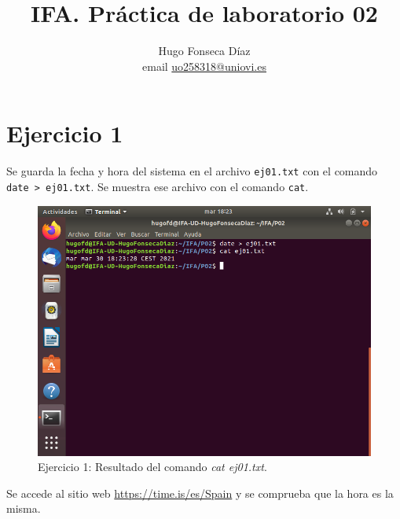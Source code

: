 \documentclass[11pt]{article}
\begin{document}
\title{IFA. Práctica de laboratorio 02}

\author{Hugo Fonseca Díaz \\ email \href{mailto:uo258318@uniovi.es}{uo258318@uniovi.es}}

\maketitle

\section{Ejercicio 1}
Se guarda la fecha y hora del sistema en el archivo \verb|ej01.txt| con el comando \verb|date > ej01.txt|. Se muestra ese archivo con el comando \verb|cat|.

\begin{figure}[H]
  \caption{Ejercicio 1: Resultado del comando \textit{cat ej01.txt}.}
  \centering
  \includegraphics{e1-1.png}
\end{figure}

Se accede al sitio web \url{https://time.is/es/Spain} y se comprueba que la hora es la misma.
\end{document}
